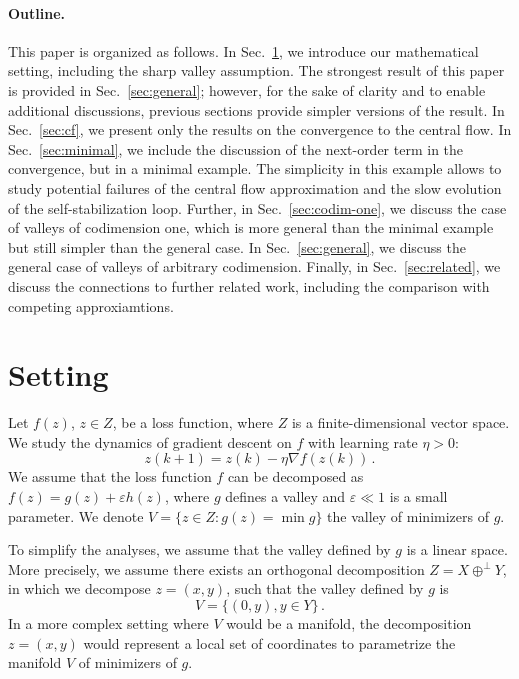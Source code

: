 \documentclass[11pt,english,reqno]{article}
\renewcommand{\leq}{\leqslant}
\theoremstyle{plain}
\theoremstyle{definition}
\theoremstyle{remark}
\numberwithin{equation}{section}
\begin{document}
\paragraph{Outline.} This paper is organized as follows. In Sec.~\ref{sec:setting}, we introduce our mathematical setting, including the sharp valley assumption. The strongest result of this paper is provided in Sec.~\ref{sec:general}; however, for the sake of clarity and to enable additional discussions, previous sections provide simpler versions of the result. In Sec.~\ref{sec:cf}, we present only the results on the convergence to the central flow. In Sec.~\ref{sec:minimal}, we include the discussion of the next-order term in the convergence, but in a minimal example. The simplicity in this example allows to study potential failures of the central flow approximation and the slow evolution of the self-stabilization loop. Further, in Sec.~\ref{sec:codim-one}, we discuss the case of valleys of codimension one, which is more general than the minimal example but still simpler than the general case. In Sec.~\ref{sec:general}, we discuss the general case of valleys of arbitrary codimension. Finally, in Sec.~\ref{sec:related}, we discuss the connections to further related work, including the comparison with competing approxiamtions.

\section{Setting}
\label{sec:setting}

Let $f(z)$, $z \in Z$, be a loss function, where $Z$ is a finite-dimensional vector space. We study the dynamics of gradient descent on $f$ with learning rate $\eta > 0$:
\begin{equation*}
    z(k+1) = z(k) - \eta \nabla f(z(k)) \, .
\end{equation*}
We assume that the loss function $f$ can be decomposed as $f(z) = g(z) + \varepsilon h(z)$, where $g$ defines a valley and $\varepsilon \ll 1$ is a small parameter. We denote $V = \{ z \in Z : g(z) = \min g\}$ the valley of minimizers of $g$. 


To simplify the analyses, we assume that the valley defined by $g$ is a linear space. More precisely, we assume there exists an orthogonal decomposition $Z = X \oplus^\perp Y$, in which we decompose $z = (x, y)$, such that the valley defined by $g$ is
\begin{equation*}
    V = \{(0,y), y \in Y\} \, . 
\end{equation*} 
In a more complex setting where $V$ would be a manifold, the decomposition $z = (x,y)$ would represent a local set of coordinates to parametrize the manifold $V$ of minimizers of $g$. 
\end{document}
